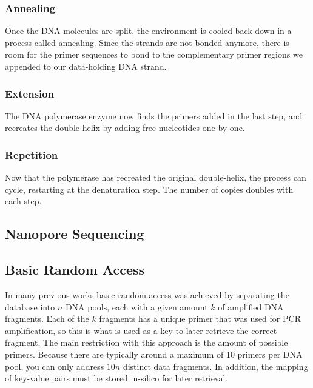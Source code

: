 \documentclass[a4paper,conference]{IEEEtran}
\begin{document}
\subsubsection{Annealing}
Once the DNA molecules are split, the environment is cooled back down in a process called annealing. Since the strands are not bonded anymore, there is room for the primer sequences to bond to the complementary primer regions we appended to our data-holding DNA strand.
\subsubsection{Extension}
The DNA polymerase enzyme now finds the primers added in the last step, and recreates the double-helix by adding free nucleotides one by one.
\subsubsection{Repetition}
Now that the polymerase has recreated the original double-helix, the process can cycle, restarting at the denaturation step. The number of copies doubles with each step.

\subsection{Nanopore Sequencing}

\subsection{Basic Random Access}
In many previous works \cite{} basic random access was achieved by separating the database into $n$ DNA pools, each with a given amount $k$ of amplified DNA fragments. Each of the $k$ fragments has a unique primer that was used for PCR amplification, so this is what is used as a key to later retrieve the correct fragment. The main restriction with this approach is the amount of possible primers. Because there are typically around a maximum of 10 primers per DNA pool, you can only address $10n$ distinct data fragments. In addition, the mapping of key-value pairs must be stored in-silico for later retrieval. 
\end{document}
